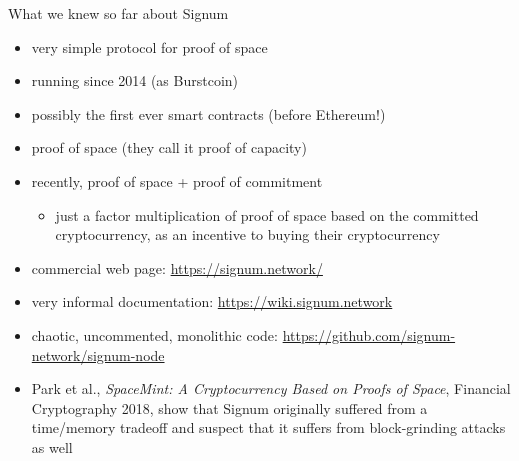 \documentclass[11pt]{beamer}  %
\begin{document}
\begin{frame}{What we knew so far about Signum}

  \begin{itemize}
  \item very simple protocol for proof of space
  \item running since 2014 (as Burstcoin)
  \item possibly the first ever smart contracts (before Ethereum!)
  \item proof of space (they call it proof of capacity)
  \item recently, proof of space + proof of commitment
    \begin{itemize}
    \item[] just a factor multiplication of proof of space
      based on the committed cryptocurrency, as an incentive
      to buying their cryptocurrency
    \end{itemize}
  \item commercial web page: \url{https://signum.network/}
  \item very informal documentation:
    \url{https://wiki.signum.network}
  \item chaotic, uncommented, monolithic code:
    \url{https://github.com/signum-network/signum-node}
  \item Park et al., \emph{SpaceMint: A Cryptocurrency Based on Proofs of Space},
    Financial Cryptography 2018,
    show that Signum originally suffered from a time/memory tradeoff
    and suspect that it suffers from block-grinding attacks as well
  \end{itemize}

\end{frame}
\end{document}
